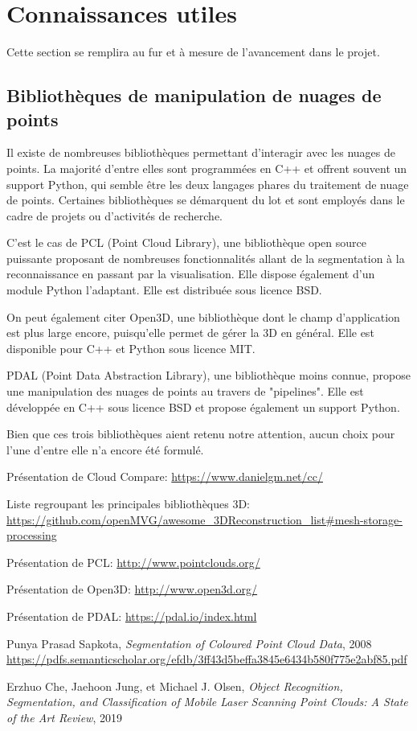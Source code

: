 \documentclass[12pt,titlepage,french]{article}
\begin{document}
\section{Connaissances utiles}

Cette section se remplira au fur et à mesure de l'avancement dans le projet.

\subsection*{Bibliothèques de manipulation de nuages de points}
Il existe de nombreuses bibliothèques permettant d'interagir avec les nuages de points. La majorité d'entre elles sont programmées en C++ et offrent souvent un support Python, qui semble être les deux langages phares du traitement de nuage de points.
Certaines bibliothèques se démarquent du lot et sont employés dans le cadre de projets ou d'activités de recherche.

C'est le cas de PCL (Point Cloud Library), une bibliothèque open source puissante proposant de nombreuses fonctionnalités allant de la segmentation à la reconnaissance en passant par la visualisation. Elle dispose également d'un module Python l'adaptant. Elle est distribuée sous licence BSD.

On peut également citer Open3D, une bibliothèque dont le champ d'application est plus large encore, puisqu'elle permet de gérer la 3D en général. Elle est disponible pour C++ et Python sous licence MIT.

PDAL (Point Data Abstraction Library), une bibliothèque moins connue, propose une manipulation des nuages de points au travers de "pipelines". Elle est développée en C++ sous licence BSD et propose également un support Python.

Bien que ces trois bibliothèques aient retenu notre attention, aucun choix pour l'une d'entre elle n'a encore été formulé. 

\newpage
\begin{thebibliography}{9}
 Présentation de Cloud Compare:
\url{https://www.danielgm.net/cc/}

 Liste regroupant les principales bibliothèques 3D:
\url{https://github.com/openMVG/awesome_3DReconstruction_list#mesh-storage-processing}

 Présentation de PCL:
\url{http://www.pointclouds.org/}

 Présentation de Open3D:
\url{http://www.open3d.org/}

 Présentation de PDAL:
\url{https://pdal.io/index.html}

 Punya Prasad Sapkota, \textit{Segmentation of Coloured Point Cloud Data}, 2008
\url{https://pdfs.semanticscholar.org/efdb/3ff43d5beffa3845e6434b580f775e2abf85.pdf}

 Erzhuo Che, Jaehoon Jung, et Michael J. Olsen, \textit{Object Recognition, Segmentation, and Classification of Mobile Laser Scanning Point Clouds: A State of the Art Review}, 2019
\end{thebibliography}
\end{document}
